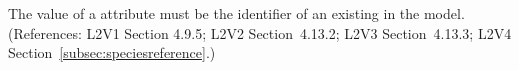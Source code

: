The value of a \SpeciesReference {} attribute must be the
identifier of an existing \Species in the model.  (References: L2V1 Section
4.9.5; L2V2 Section~4.13.2; L2V3 Section~4.13.3; L2V4 Section~\ref{subsec:speciesreference}.)
